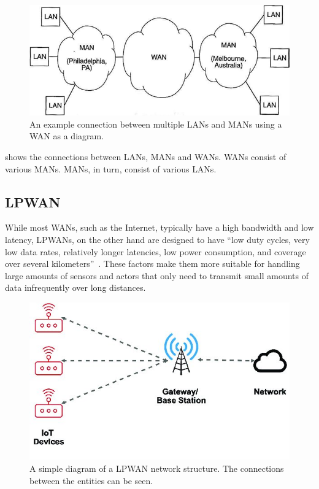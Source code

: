 \begin{figure}[htbp]
    \centering
    \includegraphics[width=.6\textwidth]{pictures/lorawan-structure/wan_diagram.png}
    \caption{
        An example connection between multiple \acfp{LAN} and \acfp{MAN} using a \acf{WAN} as a diagram.\protect\cite{sadiku_fundamentals_2022}
    }\label{pic:wan-diagram}
\end{figure}

 shows the connections between \acfp{LAN}, \acfp{MAN} and \acfp{WAN}.
\acp{WAN} consist of various \acp{MAN}.
\acp{MAN}, in turn, consist of various \acp{LAN}.

\subsection{\acf{LPWAN}}


While most \acp{WAN}, such as the Internet, typically have a high bandwidth and low latency, \acp{LPWAN}, on the other hand are designed to have ``low duty cycles, very low data rates, relatively longer latencies, low power consumption, and coverage over several kilometers''~\cite[p. 289]{kumar_connecting_2023}.
These factors make them more suitable for handling large amounts of sensors and actors that only need to transmit small amounts of data infrequently over long distances.

\begin{figure}[htbp]
    \centering
    \includegraphics[width=.5\textwidth]{pictures/lorawan-structure/lpwan_network_structure.jpg}
    \caption{
        A simple diagram of a \ac{LPWAN} network structure.
        The connections between the entities can be seen.\protect\cite{fernandez_assessing_2020}
    }\label{pic:lpwan-diagram}
\end{figure}

